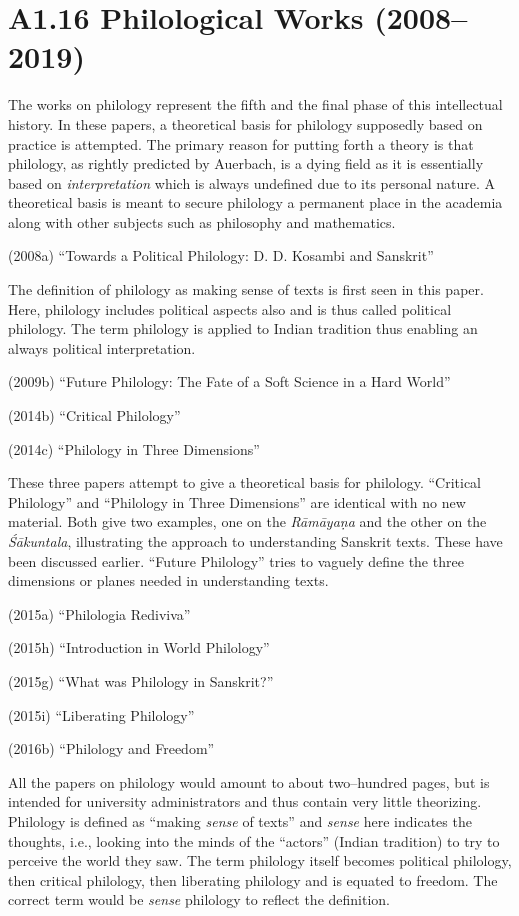 \newpage

\section*{A1.16 Philological Works (2008–2019)}

The works on philology represent the fifth and the final phase of this intellectual history. In these papers, a theoretical basis for philology supposedly based on practice is attempted. The primary reason for putting forth a theory is that philology, as rightly predicted by Auerbach, is a dying field as it is essentially based on \textit{interpretation} which is always undefined due to its personal nature. A theoretical basis is meant to secure philology a permanent place in the academia along with other subjects such as philosophy and mathematics.

(2008a) “Towards a Political Philology: D. D. Kosambi and Sanskrit”

The definition of philology as making sense of texts is first seen in this paper. Here, philology includes political aspects also and is thus called political philology. The term philology is applied to Indian tradition thus enabling an always political interpretation.

(2009b) “Future Philology: The Fate of a Soft Science in a Hard World”

(2014b) “Critical Philology”

(2014c) “Philology in Three Dimensions”

These three papers attempt to give a theoretical basis for philology. “Critical Philology” and “Philology in Three Dimensions” are identical with no new material. Both give two examples, one on the \textit{Rāmāyaṇa} and the other on the \textit{Śākuntala}, illustrating the approach to understanding Sanskrit texts. These have been discussed earlier. “Future Philology” tries to vaguely define the three dimensions or planes needed in understanding texts.

(2015a) “Philologia Rediviva”

(2015h) “Introduction in World Philology”

(2015g) “What was Philology in Sanskrit?”

(2015i) “Liberating Philology”

(2016b) “Philology and Freedom”


All the papers on philology would amount to about two–hundred pages, but is intended for university administrators and thus contain very little theorizing. Philology is defined as “making \textit{sense} of texts” and \textit{sense} here indicates the thoughts, i.e., looking into the minds of the “actors” (Indian tradition) to try to perceive the world they saw. The term philology itself becomes political philology, then critical philology, then liberating philology and is equated to freedom. The correct term would be \textit{sense} philology to reflect the definition.

